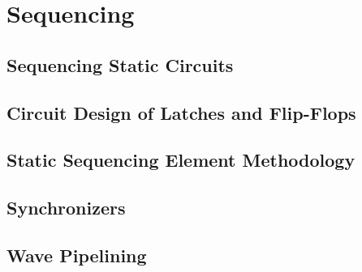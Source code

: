 \section{Sequencing}

\subsection{Sequencing Static Circuits}

\subsection{Circuit Design of Latches and Flip-Flops}

\subsection{Static Sequencing Element Methodology}

\subsection{Synchronizers}

\subsection{Wave Pipelining}

